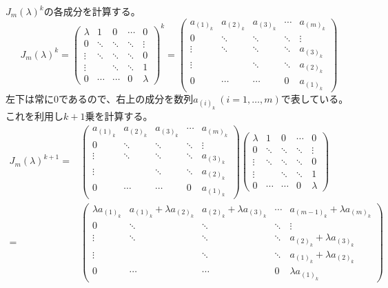 \documentclass[12pt,b5paper]{ltjsarticle}
\begin{document}
$J_m(\lambda)^k$の各成分を計算する。
\begin{equation}
 J_m(\lambda)^k
  =
  \begin{pmatrix}
   \lambda & 1 & 0 & \cdots & 0\\
   0 & \ddots & \ddots & \ddots & \vdots\\
   \vdots & \ddots & \ddots & \ddots & 0\\
   \vdots &  & \ddots & \ddots & 1\\
   0 & \cdots & \cdots & 0 & \lambda
  \end{pmatrix}^k
  =
  \begin{pmatrix}
   a_{(1)_k} & a_{(2)_k} & a_{(3)_k} & \cdots & a_{(m)_k}\\
   0 & \ddots & \ddots & \ddots & \vdots\\
   \vdots & \ddots & \ddots & \ddots & a_{(3)_k}\\
   \vdots &  & \ddots & \ddots & a_{(2)_k}\\
   0 & \cdots & \cdots & 0 & a_{(1)_k}
  \end{pmatrix}
\end{equation}
左下は常に0であるので、右上の成分を数列$a_{(i)_k} \ (i=1,\dots,m)$で表している。
これを利用し$k+1$乗を計算する。
\begin{align}
 J_m(\lambda)^{k+1}
  =&
  \begin{pmatrix}
   a_{(1)_k} & a_{(2)_k} & a_{(3)_k} & \cdots & a_{(m)_k}\\
   0 & \ddots & \ddots & \ddots & \vdots\\
   \vdots & \ddots & \ddots & \ddots & a_{(3)_k}\\
   \vdots &  & \ddots & \ddots & a_{(2)_k}\\
   0 & \cdots & \cdots & 0 & a_{(1)_k}
  \end{pmatrix}
  \begin{pmatrix}
   \lambda & 1 & 0 & \cdots & 0\\
   0 & \ddots & \ddots & \ddots & \vdots\\
   \vdots & \ddots & \ddots & \ddots & 0\\
   \vdots &  & \ddots & \ddots & 1\\
   0 & \cdots & \cdots & 0 & \lambda
  \end{pmatrix}\\
  =&
  \begin{pmatrix}
   \lambda a_{(1)_k} & a_{(1)_k} + \lambda a_{(2)_k} & a_{(2)_k} + \lambda a_{(3)_k} & \cdots & a_{(m-1)_k} + \lambda a_{(m)_k}\\
   0 & \ddots & \ddots & \ddots & \vdots\\
   \vdots & \ddots & \ddots & \ddots & a_{(2)_k} + \lambda a_{(3)_k}\\
   \vdots &  & \ddots & \ddots & a_{(1)_k} + \lambda a_{(2)_k}\\
   0 & \cdots & \cdots & 0 & \lambda a_{(1)_k}
  \end{pmatrix}
\end{align}
\end{document}
